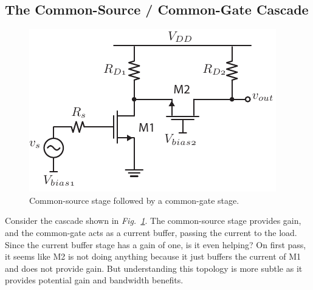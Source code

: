 \subsection{The Common-Source / Common-Gate Cascade}
\begin{figure}[tb]
\centering
\includegraphics[scale=1]{10cs_cg_cascade}
\caption{Common-source stage followed by a common-gate stage.}
\label{fig:10cs_cg_cascade}
\end{figure}
Consider the cascade shown in \emph{Fig.~\ref{fig:10cs_cg_cascade}}.  The common-source stage provides gain, and the common-gate acts as a current buffer, passing the current to the load.  Since the current buffer stage has a gain of one, is it even helping?  On first pass, it seems like M2 is not doing anything because it just buffers the current of M1 and does not provide gain.  But understanding this topology is more subtle as it provides potential gain and bandwidth benefits.
